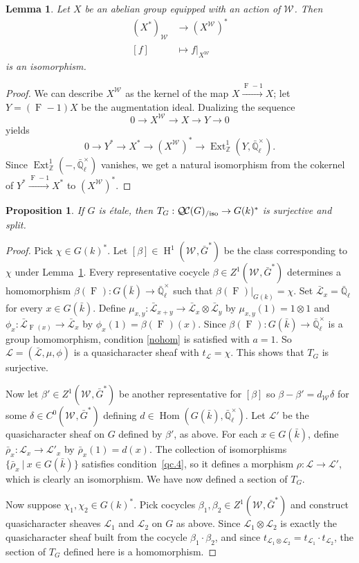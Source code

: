 \documentclass[10pt]{amsart}
\theoremstyle{plain}
\newtheorem{proposition}[theorem]{Proposition}
\newtheorem{lemma}[theorem]{Lemma}
\theoremstyle{definition}
\theoremstyle{remark}
\newcommand{\ZZ}{{\mathbb{Z}}}
\newcommand{\EE}{\mathbb{\bar Q}_\ell}
\newcommand{\bFq}{\bar{k}}
\newcommand{\Fq}{k}
\newcommand{\EEx}{\EE^\times}
\newcommand{\Weil}[1]{\mathcal{W}_{#1}}
\newcommand{\Frob}[1]{\operatorname{F}_{#1}}
\DeclareMathOperator{\Hom}{Hom}
\DeclareMathOperator{\Ext}{Ext}
\DeclareMathOperator{\Hh}{H}
\newcommand{\tq}{{\ \vert\ }}
\newcommand{\trFrob}[1]{t_{#1}}
\newcommand{\TrFrob}[1]{T_{#1}}
\newcommand{\qcs}[1]{{\mathcal{#1}}}
\newcommand{\gqcs}[1]{{\mathcal{\bar #1}}}
\newcommand{\QC}{{\mathcal{Q\hskip-0.8pt C}}}
\newcommand{\QCiso}[1]{\QC(#1)_{/\text{iso}}}
\newcommand{\bG}{\bar{G}}
\newcommand{\brho}{{\bar\rho}}
\begin{document}
\begin{lemma} \label{lem:dual-inv}
Let $X$ be an abelian group equipped with an action of $\Weil{}$.  Then
\begin{align*}
 (X^*)_{\Weil{}} &\to (X^{\Weil{}})^* \\
 [f] &\mapsto f|_{X^{\Weil{}}}
\end{align*}
is an isomorphism.
\end{lemma}

\begin{proof}
We can describe $X^{\Weil{}}$ as the kernel of the map $X \xrightarrow{\Frob{}-1} X$;
let $Y = (\Frob{}-1)X$ be the augmentation ideal.  Dualizing the sequence
\[
 0 \to X^{\Weil{}} \to X \to Y \to 0
\]
yields
\[
 0 \to Y^* \to X^* \to (X^{\Weil{}})^* \to \Ext^1_\ZZ(Y, \EEx).
\]
Since $\Ext^1_\ZZ(-,\EEx)$ vanishes, we get a natural isomorphism from the cokernel of $Y^* \xrightarrow{\Frob{}-1} X^*$ to $(X^{\Weil{}})^*$.
\end{proof}

\begin{proposition}\label{prop:sur_etale}
If $G$ is \'etale, then $\TrFrob{G} : \QCiso{G} \to G(\Fq)^*$ is surjective
and split.
\end{proposition}
\begin{proof}
Pick $\chi \in G(\Fq)^*$. 
Let $[\beta]\in \Hh^1(\Weil{},\bG^*)$ be the class corresponding to $\chi$ under Lemma~\ref{lem:dual-inv}.
Every representative cocycle $\beta \in Z^1(\Weil{},\bG^*)$ determines a homomorphism $\beta(\Frob{}) : G(\bFq)\to \EEx$ such that $\beta(\Frob{})\vert_{G(\Fq)} = \chi$.
Set $\gqcs{L}_x = \EE$ for every $x\in G(\bFq)$.
Define $\mu_{x,y} : \gqcs{L}_{x+y} \to \gqcs{L}_x\otimes \gqcs{L}_y$ by $\mu_{x,y}(1) = 1 \otimes 1$ and
$\phi_{x} : \gqcs{L}_{\Frob{}(x)} \to \gqcs{L}_x$ by $\phi_{x}(1) = \beta(\Frob{})(x)$.
Since $\beta(\Frob{}) : G(\bFq) \to \EEx$ is a group homomorphism,
condition \eqref{nohom} is satisfied with $a =1$.
So $\qcs{L} = (\gqcs{L}, \mu, \phi)$
is a quasicharacter sheaf with $\trFrob{\qcs{L}} = \chi$.
This shows that $\TrFrob{G}$ is surjective.

Now let $\beta' \in Z^1(\Weil{},\bG^*)$ be another representative for $[\beta]$
so $\beta-\beta' = d_{\Weil{}} \delta$ for some $\delta \in C^0(\Weil{},\bG^*)$ defining $d \in \Hom(G(\bFq),\EEx)$.
Let $\qcs{L}'$ be the quasicharacter sheaf on $G$ defined by $\beta'$, as above.
For each $x\in G(\bFq)$, define $\brho_x :\qcs{L}_x\to \qcs{L}'_x$ by $\brho_x(1) = d(x)$.
The collection of isomorphisms $\{ \brho_x \tq x\in G(\bFq)\}$ satisfies condition~\ref{qc.4}, so it defines a morphism $\rho : \qcs{L}\to \qcs{L}'$, which is clearly an isomorphism. 
%
We have now defined a section of $\TrFrob{G}$. 

Now suppose $\chi_1, \chi_2 \in G(\Fq)^*$. Pick cocycles $\beta_1,\beta_2\in Z^1(\Weil{},\bG^*)$ and construct quasicharacter sheaves $\qcs{L}_1$ and $\qcs{L}_2$ on $G$ as above. Since $\qcs{L}_1\otimes \qcs{L}_2$ is exactly the quasicharacter sheaf built from the cocycle $\beta_1\cdot \beta_2$, and since $\trFrob{\qcs{L}_1\otimes \qcs{L}_2} = \trFrob{\qcs{L}_1}\cdot \trFrob{\qcs{L}_2}$, the section of $\TrFrob{G}$ defined here is a homomorphism.
\end{proof}
\end{document}
